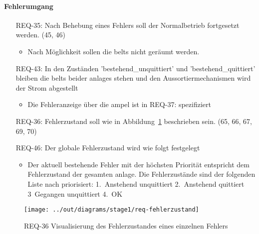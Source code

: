\paragraph{Fehlerumgang}
\begin{itemize}
    \item[REQ-35:] Nach Behebung eines Fehlers soll der Normalbetrieb fortgesetzt werden. (45, 46)
    \begin{itemize}
        \item Nach Möglichkeit sollen die \glspl{belt} nicht geräumt werden.
    \end{itemize}
    \item[REQ-43:] In den Zuständen 'bestehend\_unquittiert' und 'bestehend\_quittiert' bleiben die
    \glspl{belt} beider \glspl{anlage} stehen und den Aussortiermechanismen wird der Strom abgestellt
    \begin{itemize}
        \item Die Fehleranzeige über die \gls{ampel} ist in REQ-37: spezifiziert
    \end{itemize}
    \item[REQ-36:] Fehlerzustand soll wie in Abbildung~\ref{fig:stm-fehlerzustand} beschrieben sein. (65, 66, 67, 69, 70)
    \item[REQ-46:] Der globale Fehlerzustand wird wie folgt festgelegt
    \begin{itemize}
        \item Der aktuell bestehende Fehler mit der höchsten Priorität entspricht dem Fehlerzustand der gesamten \gls{anlage}.
        Die Fehlerzustände sind der folgenden Liste nach priorisiert: 1.\ Anstehend unquittiert
        2.\ Anstehend quittiert 3\ Gegangen unquittiert 4.\ OK
    \end{itemize}
\end{itemize}

\begin{figure}[h]
    \centering
    \texttt{[image: ../out/diagrams/stage1/req-fehlerzustand]}
    \caption{REQ-36 Visualisierung des Fehlerzustandes eines einzelnen Fehlers}
    \label{fig:stm-fehlerzustand}
\end{figure}
